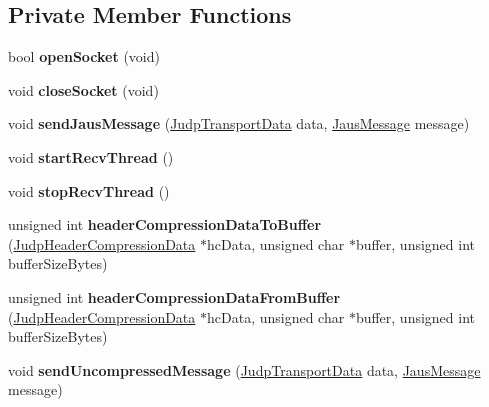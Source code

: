 \subsection*{\-Private \-Member \-Functions}
\begin{DoxyCompactItemize}
\item 
\hypertarget{class_judp_interface_a6e03895c45f19388b9ad56de666ed161}{bool {\bfseries open\-Socket} (void)}\label{class_judp_interface_a6e03895c45f19388b9ad56de666ed161}

\item 
\hypertarget{class_judp_interface_ad5ee6a4b517f4775d70ad5e7a8a83199}{void {\bfseries close\-Socket} (void)}\label{class_judp_interface_ad5ee6a4b517f4775d70ad5e7a8a83199}

\item 
\hypertarget{class_judp_interface_a361ea325f5ed152b74e848b74a31095e}{void {\bfseries send\-Jaus\-Message} (\hyperlink{struct_judp_transport_data}{\-Judp\-Transport\-Data} data, \hyperlink{struct_jaus_message_struct}{\-Jaus\-Message} message)}\label{class_judp_interface_a361ea325f5ed152b74e848b74a31095e}

\item 
\hypertarget{class_judp_interface_a1a55013d89801a924e6c06551a39ba81}{void {\bfseries start\-Recv\-Thread} ()}\label{class_judp_interface_a1a55013d89801a924e6c06551a39ba81}

\item 
\hypertarget{class_judp_interface_ad338346ca6c70a8e9c63c7e9cbad41cb}{void {\bfseries stop\-Recv\-Thread} ()}\label{class_judp_interface_ad338346ca6c70a8e9c63c7e9cbad41cb}

\item 
\hypertarget{class_judp_interface_abb643d34944ea3259a3f94bd25cefa42}{unsigned int {\bfseries header\-Compression\-Data\-To\-Buffer} (\hyperlink{struct_judp_header_compression_data}{\-Judp\-Header\-Compression\-Data} $\ast$hc\-Data, unsigned char $\ast$buffer, unsigned int buffer\-Size\-Bytes)}\label{class_judp_interface_abb643d34944ea3259a3f94bd25cefa42}

\item 
\hypertarget{class_judp_interface_a2d5c44bbe98d52c2ae8cb7611c47def3}{unsigned int {\bfseries header\-Compression\-Data\-From\-Buffer} (\hyperlink{struct_judp_header_compression_data}{\-Judp\-Header\-Compression\-Data} $\ast$hc\-Data, unsigned char $\ast$buffer, unsigned int buffer\-Size\-Bytes)}\label{class_judp_interface_a2d5c44bbe98d52c2ae8cb7611c47def3}

\item 
\hypertarget{class_judp_interface_ae2cb64054c31d4d8e4813aa0bf7445c3}{void {\bfseries send\-Uncompressed\-Message} (\hyperlink{struct_judp_transport_data}{\-Judp\-Transport\-Data} data, \hyperlink{struct_jaus_message_struct}{\-Jaus\-Message} message)}\label{class_judp_interface_ae2cb64054c31d4d8e4813aa0bf7445c3}


\end{DoxyCompactItemize}
